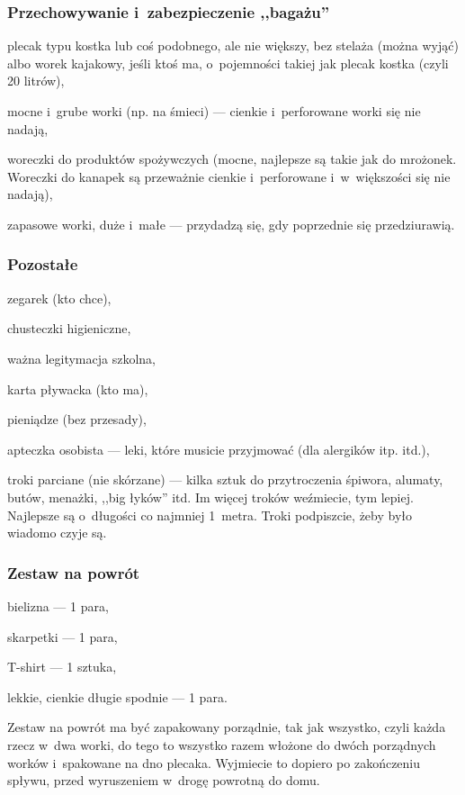 \subsubsection{Przechowywanie i~zabezpieczenie ,,bagażu''}
\begin{checklist}
\item plecak typu kostka lub coś podobnego, ale nie większy, bez stelaża (można wyjąć) albo worek kajakowy, jeśli ktoś ma, o~pojemności takiej jak plecak kostka (czyli 20 litrów),
\item mocne i~grube worki (np. na śmieci) --- cienkie i~perforowane worki się nie nadają,
\item woreczki do produktów spożywczych (mocne, najlepsze są takie jak do mrożonek. Woreczki do kanapek są przeważnie cienkie i~perforowane i~w~większości się nie nadają),
\item zapasowe worki, duże i~małe --- przydadzą się, gdy poprzednie się przedziurawią.
\end{checklist}

\subsubsection{Pozostałe}
\begin{checklist}
\item zegarek (kto chce),
\item chusteczki higieniczne,
\item ważna legitymacja szkolna,
\item karta pływacka (kto ma),
\item pieniądze (bez przesady),
\item apteczka osobista --- leki, które musicie przyjmować (dla alergików itp. itd.),
\item troki parciane (nie skórzane) --- kilka sztuk do przytroczenia śpiwora, alumaty, butów, menażki, ,,big łyków'' itd. Im więcej troków weźmiecie, tym lepiej. Najlepsze są o~długości co najmniej 1~metra. Troki podpiszcie, żeby było wiadomo czyje są.
\end{checklist}

\subsubsection{Zestaw na powrót}
\begin{checklist}
\item bielizna --- 1 para,
\item skarpetki --- 1 para,
\item T-shirt --- 1 sztuka,
\item lekkie, cienkie długie spodnie --- 1 para.
\end{checklist}
Zestaw na powrót ma być zapakowany porządnie, tak jak wszystko, czyli każda rzecz w~dwa worki, do tego to wszystko razem włożone do dwóch porządnych worków i~spakowane na dno plecaka. Wyjmiecie to dopiero po zakończeniu spływu, przed wyruszeniem w~drogę powrotną do domu.

